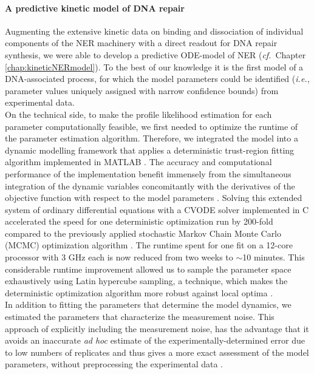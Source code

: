 \paragraph{A predictive kinetic model of DNA repair}
Augmenting the extensive kinetic data on binding and dissociation of individual components of the NER machinery \cite{Luijsterburg2010} with a direct readout for DNA repair synthesis, we were able to develop a predictive ODE-model of NER (\textit{cf.}\ Chapter \ref{chap:kineticNERmodel}). To the best of our knowledge it is the first model of a DNA-associated process, for which the model parameters could be identified (\textit{i.e.}, parameter values uniquely assigned with narrow confidence bounds) from experimental data. \\
On the technical side, to make the profile likelihood estimation for each parameter computationally feasible, we first needed to optimize the runtime of the parameter estimation algorithm. Therefore, we integrated the model into a dynamic modelling framework that applies a deterministic trust-region fitting algorithm implemented in MATLAB \cite{Raue2009}. The accuracy and computational performance of the implementation benefit immensely from the simultaneous integration of the dynamic variables concomitantly with the derivatives of the objective function with respect to the model parameters \cite{conn2009introduction,Ramachandran2010,Raue2013}. Solving this extended system of ordinary differential equations with a CVODE solver implemented in C accelerated the speed for one deterministic optimization run by 200-fold compared to the previously applied stochastic Markov Chain Monte Carlo (MCMC)\label{sec:MCMC} optimization algorithm \cite{Terstiege2010}. The runtime spent for one fit on a 12-core processor with 3 GHz each is now reduced from two weeks to $\sim$10 minutes. This considerable runtime improvement allowed us to sample the parameter space exhaustively using Latin hypercube sampling, a technique, which makes the deterministic optimization algorithm more robust against local optima \cite{Raue2013}.\\
In addition to fitting the parameters that determine the model dynamics, we estimated the parameters that characterize the measurement noise. This approach of explicitly including the measurement noise, has the advantage that it avoids an inaccurate \textit{ad hoc} estimate of the experimentally-determined error due to low numbers of replicates and thus gives a more exact assessment of the model parameters, without preprocessing the experimental data \cite{Raue2013}. \\
